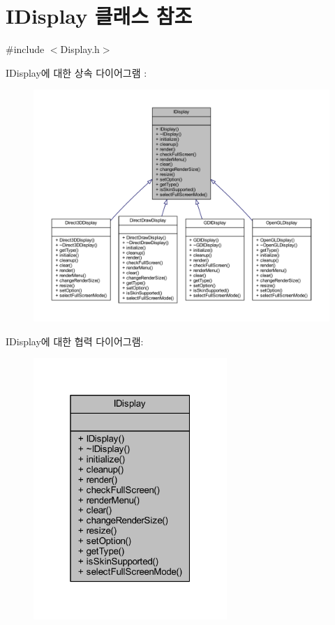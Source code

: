 \hypertarget{class_i_display}{}\section{I\+Display 클래스 참조}
\label{class_i_display}


{\ttfamily \#include $<$Display.\+h$>$}



I\+Display에 대한 상속 다이어그램 \+: \nopagebreak
\begin{figure}[H]
\begin{center}
\leavevmode
\includegraphics[width=350pt]{class_i_display__inherit__graph}
\end{center}
\end{figure}


I\+Display에 대한 협력 다이어그램\+:\nopagebreak
\begin{figure}[H]
\begin{center}
\leavevmode
\includegraphics[width=208pt]{class_i_display__coll__graph}
\end{center}
\end{figure}
